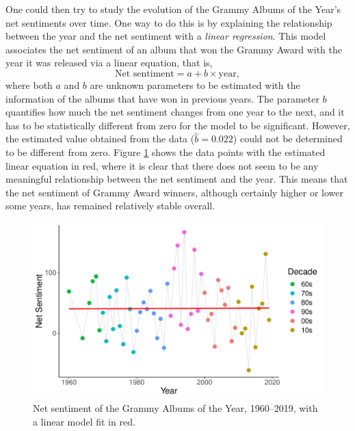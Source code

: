\documentclass{article}
\begin{document}



One could then try to study the evolution of the Grammy Albums of the Year's net sentiments over time. One way to do this is by explaining the relationship between the year and the net sentiment with a \textit{linear regression}. This model associates the net sentiment of an album that won the Grammy Award with the year it was released via a linear equation, that is,
\begin{equation*}
    \text{Net sentiment} = a + b \times \text{year},
\end{equation*}
where both $a$ and $b$ are unknown parameters to be estimated with the information of the albums that have won in previous years. The parameter $b$ quantifies how much the net sentiment changes from one year to the next, and it has to be statistically different from zero for the model to be significant. However, the estimated value obtained from the data ($\hat{b} = 0.022$) could not be determined to be different from zero. Figure \ref{fig:sentiment_lm} shows the data points with the estimated linear equation in red, where it is clear that there does not seem to be any meaningful relationship between the net sentiment and the year. This means that the net sentiment of Grammy Award winners, although certainly higher or lower some years, has remained relatively stable overall.  


\begin{figure}[h]
    \centering
    \includegraphics[scale=0.5]{Plots/graph_sentiment_linear_trend.pdf}
    \caption{Net sentiment of the Grammy Albums of the Year, 1960--2019, with a linear model fit in red.}
    \label{fig:sentiment_lm}
\end{figure}
\end{document}
